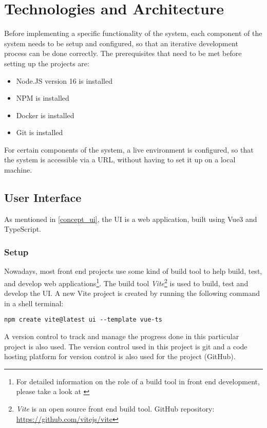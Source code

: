 \section{Technologies and Architecture}

Before implementing a specific functionality of the system, each component of the system needs to be setup and configured, so that an iterative development process can be done correctly. The prerequisites that need to be met before setting up the projects are: 

\begin{itemize}
 \item Node.JS version 16 is installed
 \item NPM is installed
 \item Docker is installed
 \item Git is installed
\end{itemize}

For certain components of the system, a live environment is configured, so that the system is accessible via a URL, without having to set it up on a local machine. 


 \subsection{User Interface}
 As mentioned in \autoref{concept_ui}, the UI is a web application, built using Vue3 and TypeScript.

  \subsubsection{Setup}
   Nowadays, most front end projects use some kind of build tool to help build, test, and develop web applications\footnote{For detailed information on the role of a build tool in front end development, please take a look at \autocite{Odell2014}}. The build tool \emph{Vite}\footnote{\emph{Vite} is an open source front end build tool. GitHub repository: \url{https://github.com/vitejs/vite}} is used to build, test and develop the UI. A new Vite project is created by running the following command in a shell terminal:
  
  \begin{lstlisting}[caption={Creating a new Vite project (Shell)}]
 npm create vite@latest ui --template vue-ts
  \end{lstlisting}

  A version control to track and manage the progress done in this particular project is also used. The version control used in this project is git and a code hosting platform for version control is also used for the project (GitHub).

